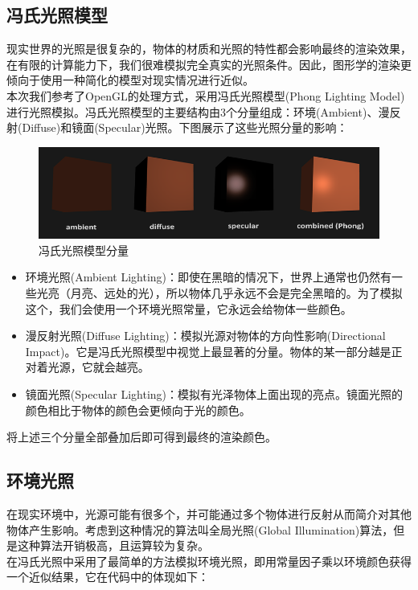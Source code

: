     \subsection{冯氏光照模型}
        \begin{spacing}{2.5}
    现实世界的光照是很复杂的，物体的材质和光照的特性都会影响最终的渲染效果，在有限的计算能力下，我们很难模拟完全真实的光照条件。因此，图形学的渲染更倾向于使用一种简化的模型对现实情况进行近似。\\
    本次我们参考了OpenGL的处理方式，采用冯氏光照模型(Phong Lighting Model)进行光照模拟。冯氏光照模型的主要结构由3个分量组成：环境(Ambient)、漫反射(Diffuse)和镜面(Specular)光照。下图展示了这些光照分量的影响：\\
    \begin{figure}[H]
    	\centering
		\includegraphics[width=1.0\textwidth]{images/phong_model.png}
		\caption{冯氏光照模型分量}
		\label{phong_model}
    \end{figure}
    
    \begin{itemize}
    	\item 环境光照(Ambient Lighting)：即使在黑暗的情况下，世界上通常也仍然有一些光亮（月亮、远处的光），所以物体几乎永远不会是完全黑暗的。为了模拟这个，我们会使用一个环境光照常量，它永远会给物体一些颜色。
    	\item 漫反射光照(Diffuse Lighting)：模拟光源对物体的方向性影响(Directional Impact)。它是冯氏光照模型中视觉上最显著的分量。物体的某一部分越是正对着光源，它就会越亮。
    	\item 镜面光照(Specular Lighting)：模拟有光泽物体上面出现的亮点。镜面光照的颜色相比于物体的颜色会更倾向于光的颜色。
    \end{itemize}
    
    将上述三个分量全部叠加后即可得到最终的渲染颜色。
    
    \subsection{环境光照}
    
    在现实环境中，光源可能有很多个，并可能通过多个物体进行反射从而简介对其他物体产生影响。考虑到这种情况的算法叫全局光照(Global Illumination)算法，但是这种算法开销极高，且运算较为复杂。\\
    在冯氏光照中采用了最简单的方法模拟环境光照，即用常量因子乘以环境颜色获得一个近似结果，它在代码中的体现如下：
   

\end{spacing}
